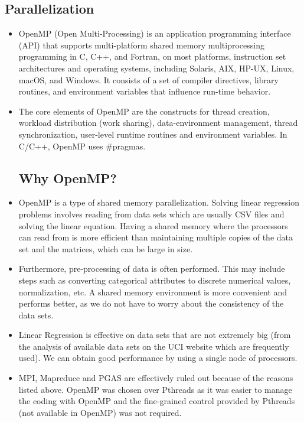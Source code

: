 \documentclass{article}
\begin{document}
\begin{spacing}{1.1}
\section{Parallelization}

\begin{itemize}
    \subsection{OpenMP}
    \item OpenMP (Open Multi-Processing) is an application programming interface (API) that supports multi-platform shared memory multiprocessing programming in C, C++, and Fortran, on most platforms, instruction set architectures and operating systems, including Solaris, AIX, HP-UX, Linux, macOS, and Windows. It consists of a set of compiler directives, library routines, and environment variables that influence run-time behavior.
    \item The core elements of OpenMP are the constructs for thread creation, workload distribution (work sharing), data-environment management, thread synchronization, user-level runtime routines and environment variables. In C/C++, OpenMP uses \#pragmas.
    \subsection{Why OpenMP?}
    \item OpenMP is a type of shared memory parallelization. Solving linear regression problems involves reading from data sets which are usually CSV files and solving the linear equation. Having a shared memory where the processors can read from is more efficient than maintaining multiple copies of the data set and the matrices, which can be large in size.
    \item Furthermore, pre-processing of data is often performed. This may include steps such as converting categorical attributes to discrete numerical values, normalization, etc. A shared memory environment is more convenient and performs better, as we do not have to worry about the consistency of the data sets.
    \item Linear Regression is effective on data sets that are not extremely big (from the analysis of available data sets on the UCI website \cite{UCI} which are frequently used). We can obtain good performance by using a single node of processors.
    \item MPI, Mapreduce and PGAS are effectively ruled out because of the reasons listed above. OpenMP was chosen over Pthreads as it was easier to manage the coding with OpenMP and the fine-grained control provided by Pthreads (not available in OpenMP) was not required.

\end{itemize}
\end{spacing}
\end{document}
